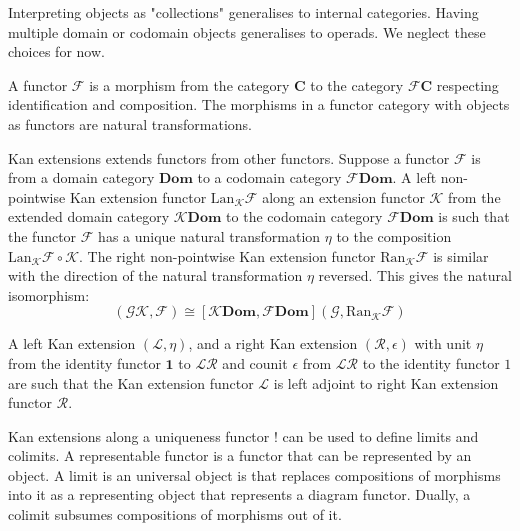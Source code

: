 \documentclass[10pt]{amsbook}
\theoremstyle{definition}
\theoremstyle{remark}
\numberwithin{section}{chapter}
\numberwithin{equation}{chapter}
\begin{document}

Interpreting objects as "collections" generalises to internal categories. Having multiple domain or codomain objects generalises to operads. We neglect these choices for now. 

A functor $\mathcal{F}$ is a morphism from the category $\mathbf{C}$ to the category $\mathcal{F}\mathbf{C}$ respecting identification and composition. The morphisms in a functor category with objects as functors are natural transformations.

Kan extensions extends functors from other functors. Suppose a functor $\mathcal{F}$ is from a domain category $\mathbf{Dom}$ to a codomain category $\mathcal{F} \mathbf{Dom}$. A left non-pointwise Kan extension functor $\mathrm{Lan}_\mathcal{K} \mathcal{F}$ along an extension functor $\mathcal{K}$ from the extended domain category $\mathcal{K} \mathbf{Dom}$ to the codomain category $\mathcal{F} \mathbf{Dom}$ is such that the functor $\mathcal{F}$ has a unique natural transformation $\eta$ to the composition $\mathrm{Lan}_\mathcal{K} \mathcal{F} \circ \mathcal{K}$. The right non-pointwise Kan extension functor $\mathrm{Ran}_\mathcal{K} \mathcal{F}$ is similar with the direction of the natural transformation $\eta$ reversed.
This gives the natural isomorphism:
\begin{equation}
    [\mathbf{Dom}, \mathcal{F} \mathbf{Dom}](\mathcal{G} \mathcal{K}, \mathcal{F}) \cong 
    [\mathcal{K} \mathbf{Dom}, \mathcal{F} \mathbf{Dom}](\mathcal{G}, \mathrm{Ran}_\mathcal{K} \mathcal{F})
\end{equation}

A left Kan extension $(\mathcal{L}, \eta)$, and a right Kan extension $(\mathcal{R}, \epsilon)$ with unit $\eta$ from the identity functor $\mathbf{1}$ to $\mathcal{L} \mathcal{R}$ and counit $\epsilon$ from $\mathcal{L} \mathcal{R}$ to the identity functor $\mathcal{1}$ are such that the Kan extension functor $\mathcal{L}$ is left adjoint to right Kan extension functor $\mathcal{R}$.

Kan extensions along a uniqueness functor $\mathbf{!}$ can be used to define limits and colimits. A representable functor is a functor that can be represented by an object. A limit is an universal object is that replaces compositions of morphisms into it as a representing object that represents a diagram functor. Dually, a colimit subsumes compositions of morphisms out of it.
\end{document}
